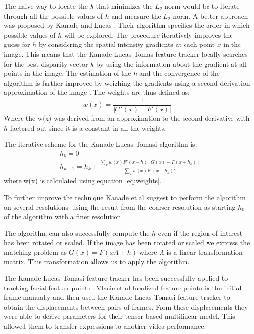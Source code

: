 \documentclass[11pt,a4paper]{report}
\begin{document}
The naive way to locate the $h$ that minimizes the $L_2$ norm would be to
iterate through all the possible values of $h$ and measure the $L_2$ norm. A
better approach was proposed by Kanade and Lucas \cite{kanade}. Their algorithm
specifies the order in which possible values of $h$ will be explored. The procedure
iteratively improves the guess for $h$ by considering the spatial intensity
gradients at each point $x$ in the image. This means that the Kanade-Lucas-Tomas
feature tracker locally searches for the best disparity vector $h$ by using the
information about the gradient at all points in the image. The estimation of the
$h$ and the convergence of the algorithm is further improved by weighing the gradients using a second derivation
approximation of the image \cite{kanade}. The weights are thus defined as:
\begin{equation}\label{eq:weights}
w(x) = \frac{1}{\lvert G'(x) - F'(x) \rvert}
\end{equation}
Where the w(x) was derived from an approximation to the second derivative with
$h$ factored out since it is a constant in all the weights.

 The iterative scheme for the Kanade-Lucas-Tomasi algorithm is:
\begin{align}
&h_0 = 0\\
&h_{k+1} = h_k + \frac{\sum_x w(x) F'(x + h)[G(x) - F(x +h_k)]}{\sum_x
  w(x)F'(x+h_k)^2}
\end{align}
where w(x) is calculated using equation \ref{eq:weights}.

To further improve the technique Kanade et al suggest to perform the algorithm
on several resolutions, using the result from the coarser resolution as starting
$h_0$ of the algorithm with a finer resolution. 

The algorithm can also successfully compute the $h$ even if the region of interest has been rotated or
scaled. If the image has been rotated or scaled we express the matching problem
as $G(x) = F(xA +h)$ where $A$ is a linear transformation matrix. This
transformation allows us
to apply the algorithm.

The Kanade-Lucas-Tomasi feature tracker has been successfully applied to
tracking facial feature points \cite{faceTransfer05}. Vlasic et al localized
feature points in the initial frame manually and then used the
Kanade-Lucas-Tomasi feature tracker to obtain the displacements between pairs of
frames. From these displacements they were able to derive parameters for their
tensor-based multilinear model. This allowed them to transfer expressions to
another video performance.
\end{document}
